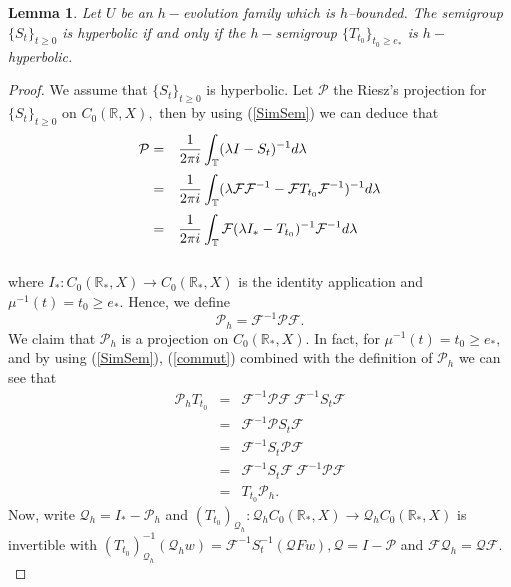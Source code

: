 \documentclass[10pt]{amsart}
\newtheorem{lemma}{Lemma}
\numberwithin{equation}{section}
\begin{document}
\begin{lemma}\label{SG-hyperb}
Let $U$ be an $h-$evolution family which is $h$--bounded. The  semigroup $\{S_t\}_{t \ge 0}$  is hyperbolic if and  only if  the $h-$semigroup  $\{T_{t_0}\}_{t_0 \ge e_*}$ is $h-$hyperbolic.
\end{lemma}
\begin{proof}
 We assume that $\{S_t\}_{t \ge 0}$ is hyperbolic. Let $\mathcal{P}$ the Riesz's projection for $\{S_t\}_{t \ge 0}$ on $C_0(\mathbb{R},X),$ then by using (\ref{SimSem}) we can deduce that
$$
\begin{array}{rl}
\medskip
\mathcal{P} = & \displaystyle \frac{1}{2\pi i} \int_{\mathbb{T}} (\lambda I - S_t)^{-1} d\lambda \\
\medskip
= &\displaystyle \frac{1}{2\pi i} \int_{\mathbb{T}} (\lambda \mathcal{F}\mathcal{F}^{-1} - \mathcal{F} T_{t_0} \mathcal{F}^{-1})^{-1} d\lambda \\
\medskip
= & \displaystyle \frac{1}{2\pi i} \int_{\mathbb{T}} \mathcal{F} (\lambda I_* -  T_{t_0}) ^{-1} \mathcal{F}^{-1} d\lambda  
\medskip 
\end{array}
$$
where $I_*: C_0(\mathbb{R}_*,X) \to C_0(\mathbb{R}_*,X)$ is the identity application and $\mu^{-1}(t)  = t_0 \ge e_*.$ Hence, we define
$$
\mathcal{P}_h =\mathcal{F}^{-1} \mathcal{P} \mathcal{F}.
$$
We claim that $\mathcal{P}_h$ is a projection on $ C_0(\mathbb{R}_*,X).$ In fact, for $\mu^{-1}(t) = t_0 \ge e_*,$
and by using (\ref{SimSem}), (\ref{commut}) combined with the definition of $\mathcal{P}_{h}$ we can see that
$$
\begin{array}{rcl}
\mathcal{P}_h T_{t_0} & = &\mathcal{F}^{-1} \mathcal{P} \mathcal{F} \ \mathcal{F}^{-1} S_t \mathcal{F} \\
&=&\mathcal{F}^{-1}  \mathcal{P}  S_t \mathcal{F}\\
&=& \mathcal{F}^{-1} S_t \mathcal{P} \mathcal{F} \\
&=& \mathcal{F}^{-1} S_t  \mathcal{F} \ \mathcal{F}^{-1} \mathcal{P} \mathcal{F} \\
&=& T_{t_0} \mathcal{P}_h.
\end{array}$$
Now, write $\mathcal{Q}_h = I_* - \mathcal{P}_h$ and $(T_{t_0})_{\mathcal{Q}_h}:\mathcal{Q}_h C_0(\mathbb{R}_*,X) \to\mathcal{Q}_h C_0(\mathbb{R}_*,X)$ is invertible with $(T_{t_0})^{-1}_{\mathcal{Q}_h} (\mathcal{Q}_h w)= \mathcal{F}^{-1} S_t^{-1}(\mathcal{Q} F w),\mathcal{Q} = I - \mathcal{P}$ and $\mathcal{F}\mathcal{Q}_h = \mathcal{Q} \mathcal{F}.$


\end{proof}
\end{document}
